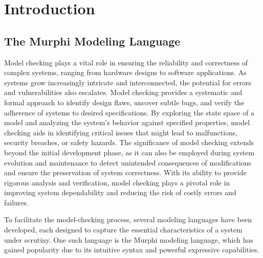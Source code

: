 
\section{Introduction}\label{sec:introduction}

\subsection{The Murphi Modeling Language}\label{subsec:the-murphi-modeling-language}

Model checking plays a vital role in ensuring the reliability and correctness
of complex systems, ranging from hardware designs to software applications.
As systems grow increasingly intricate and interconnected, the potential for
errors and vulnerabilities also escalates.
Model checking provides a systematic and formal approach to identify design
flaws, uncover subtle bugs, and verify the adherence of systems to desired
specifications.
By exploring the state space of a model and analyzing the system's behavior
against specified properties, model checking aids in identifying critical
issues that might lead to malfunctions, security breaches, or safety hazards.
The significance of model checking extends beyond the initial development
phase, as it can also be employed during system evolution and maintenance to
detect unintended consequences of modifications and ensure the preservation
of system correctness.
With its ability to provide rigorous analysis and verification, model
checking plays a pivotal role in improving system dependability and reducing
the risk of costly errors and failures.

To facilitate the model-checking process, several modeling languages have been
developed, each designed to capture the essential characteristics of a system
under scrutiny.
One such language is the Murphi modeling language, which has gained popularity
due to its intuitive syntax and powerful expressive capabilities.

